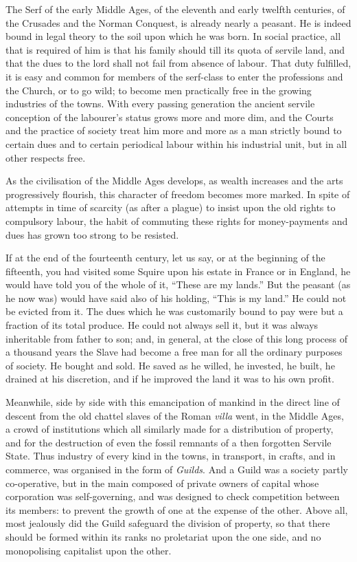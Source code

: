 \documentclass{book}
\begin{document}
The Serf of the early Middle Ages, of the eleventh and early twelfth centuries, of the Crusades and the Norman Conquest, is already nearly a peasant. He is indeed bound in legal theory to the soil upon which he was born. In social practice, all that is required of him is that his family should till its quota of servile land, and that the dues to the lord shall not fail from absence of labour. That duty fulfilled, it is easy and common for members of the serf-class to enter the professions and the Church, or to go wild; to become men practically free in the growing industries of the towns. With every passing generation the ancient servile conception of the labourer’s status grows more and more dim, and the Courts and the practice of society treat him more and more as a man strictly bound to certain dues and to certain periodical labour within his industrial unit, but in all other respects free.

As the civilisation of the Middle Ages develops, as wealth increases and the arts progressively flourish, this character of freedom becomes more marked. In spite of attempts in time of scarcity (as after a plague) to insist upon the old rights to compulsory labour, the habit of commuting these rights for money-payments and dues has grown too strong to be resisted.

If at the end of the fourteenth century, let us say, or at the beginning of the fifteenth, you had visited some Squire upon his estate in France or in England, he would have told you of the whole of it, “These are my lands.” But the peasant (as he now was) would have said also of his holding, “This is my land.” He could not be evicted from it. The dues which he was customarily bound to pay were but a fraction of its total produce. He could not always sell it, but it was always inheritable from father to son; and, in general, at the close of this long process of a thousand years the Slave had become a free man for all the ordinary purposes of society. He bought and sold. He saved as he willed, he invested, he built, he drained at his discretion, and if he improved the land it was to his own profit.

Meanwhile, side by side with this emancipation of mankind in the direct line of descent from the old chattel slaves of the Roman \emph{villa} went, in the Middle Ages, a crowd of institutions which all similarly made for a distribution of property, and for the destruction of even the fossil remnants of a then forgotten Servile State. Thus industry of every kind in the towns, in transport, in crafts, and in commerce, was organised in the form of \emph{Guilds}. And a Guild was a society partly co-operative, but in the main composed of private owners of capital whose corporation was self-governing, and was designed to check competition between its members: to prevent the growth of one at the expense of the other. Above all, most jealously did the Guild safeguard the division of property, so that there should be formed within its ranks no proletariat upon the one side, and no monopolising capitalist upon the other.
\end{document}
